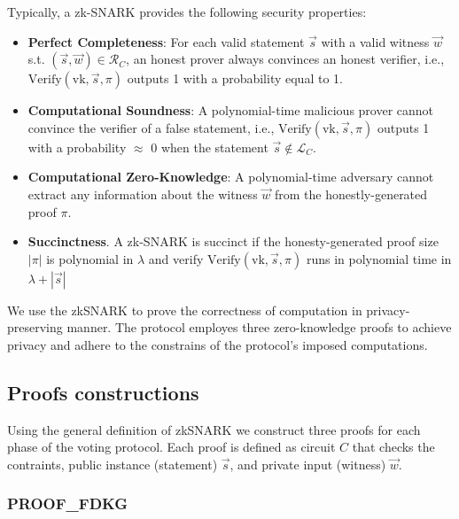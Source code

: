 \documentclass{article}
\begin{document}
Typically, a zk-SNARK provides the following security properties:
\begin{itemize}
    \item \textbf{Perfect Completeness}: For each valid statement $\vec{s}$ with a valid witness $\vec{w}$ s.t. $(\vec{s}, \vec{w}) \in \mathcal{R}_C$, an honest prover always convinces an honest verifier, i.e., $\textrm{Verify}(\textrm{vk}, \vec{s}, \pi)$ outputs 1 with a probability equal to 1.
    \item \textbf{Computational Soundness}: A polynomial-time malicious prover cannot convince the verifier of a false statement, i.e., $\textrm{Verify}(\textrm{vk}, \vec{s}, \pi)$ outputs 1 with a probability $\approx$ 0 when the statement $\vec{s} \notin \mathcal{L}_C$.
    \item \textbf{Computational Zero-Knowledge}: A polynomial-time adversary cannot extract any information about the witness $\vec{w}$ from the honestly-generated proof $\pi$. 
    \item \textbf{Succinctness}. A zk-SNARK is succinct if the honesty-generated proof size $|\pi|$ is polynomial in $\lambda$ and verify $\textrm{Verify}(\textrm{vk}, \vec{s}, \pi)$ runs in polynomial time in $\lambda + |\vec{s}|$
\end{itemize}

We use the zkSNARK to prove the correctness of computation in privacy-preserving manner.
The protocol employes three zero-knowledge proofs to achieve privacy and adhere to the constrains of the protocol's imposed computations.



\subsection{Proofs constructions}\label{sec:proofs}

Using the general definition of zkSNARK we construct three proofs for each phase of the voting protocol. Each proof is defined as circuit $C$ that checks the contraints, public instance (statement) $\vec{s}$, and private input (witness) $\vec{w}$.

\subsubsection{\textrm{PROOF}_\textrm{FDKG}}\label{sec:proof-fdkg}
\end{document}
